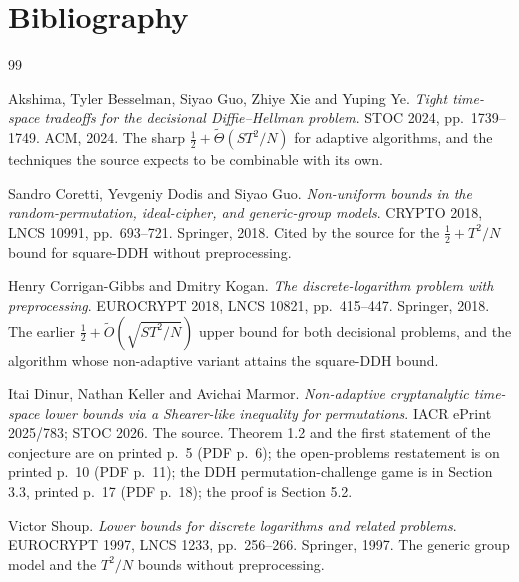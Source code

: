 \documentclass{aicr-conjecture}
\newcommand{\Ot}{\widetilde{O}}
\newcommand{\Th}{\widetilde{\Theta}}
\begin{document}
\section{Bibliography}

\begin{aicrbibliography}{99}

Akshima, Tyler Besselman, Siyao Guo, Zhiye Xie and Yuping Ye.
\emph{Tight time-space tradeoffs for the decisional Diffie--Hellman
problem}.
STOC 2024, pp.\ 1739--1749. ACM, 2024.
The sharp $\tfrac{1}{2} + \Th(ST^{2}/N)$ for adaptive algorithms, and
the techniques the source expects to be combinable with its own.

Sandro Coretti, Yevgeniy Dodis and Siyao Guo.
\emph{Non-uniform bounds in the random-permutation, ideal-cipher, and
generic-group models}.
CRYPTO 2018, LNCS 10991, pp.\ 693--721. Springer, 2018.
Cited by the source for the $\tfrac{1}{2} + T^{2}/N$ bound for
square-DDH without preprocessing.

Henry Corrigan-Gibbs and Dmitry Kogan.
\emph{The discrete-logarithm problem with preprocessing}.
EUROCRYPT 2018, LNCS 10821, pp.\ 415--447. Springer, 2018.
The earlier $\tfrac{1}{2} + \Ot(\sqrt{ST^{2}/N})$ upper bound for both
decisional problems, and the algorithm whose non-adaptive variant
attains the square-DDH bound.

Itai Dinur, Nathan Keller and Avichai Marmor.
\emph{Non-adaptive cryptanalytic time-space lower bounds via a
Shearer-like inequality for permutations}.
IACR ePrint 2025/783; STOC 2026.
The source. Theorem 1.2 and the first statement of the conjecture are
on printed p.\ 5 (PDF p.\ 6); the open-problems restatement is on
printed p.\ 10 (PDF p.\ 11); the DDH permutation-challenge game is in
Section 3.3, printed p.\ 17 (PDF p.\ 18); the proof is Section 5.2.

Victor Shoup.
\emph{Lower bounds for discrete logarithms and related problems}.
EUROCRYPT 1997, LNCS 1233, pp.\ 256--266. Springer, 1997.
The generic group model and the $T^{2}/N$ bounds without
preprocessing.

\end{aicrbibliography}
\end{document}
